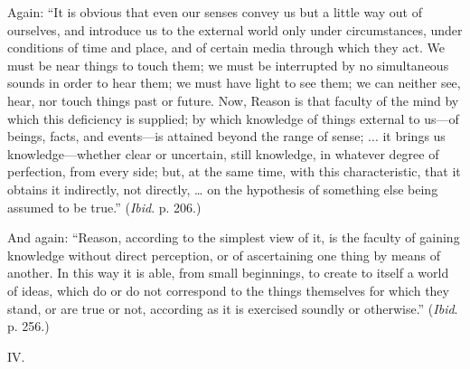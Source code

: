 Again: ``It is obvious that even our senses convey us but a
little way out of ourselves, and introduce us to the external world
only under circumstances, under conditions of time and place, and of
certain media through which they act. We must be near things to touch
them; we must be interrupted by no simultaneous sounds in order to
hear them; we must have light to see them; we can neither see, hear,
nor touch things past or future. Now, Reason is that faculty of the
mind by which this deficiency is supplied; by which knowledge of
things external to us—of beings, facts, and events—is attained
beyond the range of sense; ... it brings us knowledge—whether clear
or uncertain, still knowledge, in whatever degree of perfection, from
every side; but, at the same time, with this characteristic, that it
obtains it indirectly, not directly, … on the hypothesis of
something else being assumed to be true.'' (\emph{Ibid}. p. 206.)

And again: ``Reason, according to the simplest view of it, is
the faculty of gaining knowledge without direct perception, or of
ascertaining one thing by means of another. In this way it is able,
from small beginnings, to create to itself a world of ideas, which do
or do not correspond to the things themselves for which they stand, or
are true or not, according as it is exercised soundly or
otherwise.'' (\emph{Ibid}. p. 256.)

IV.


